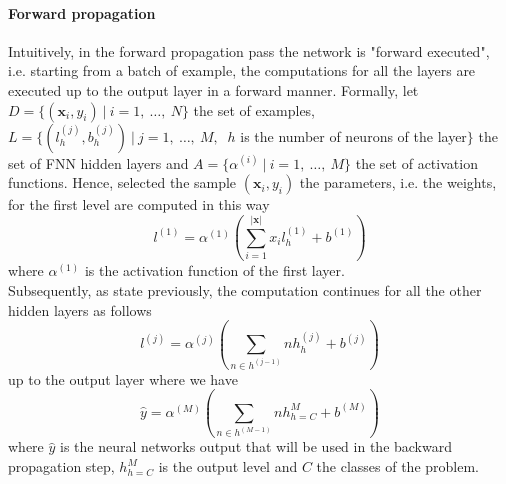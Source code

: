 \paragraph{Forward propagation}
Intuitively, in the forward propagation pass the network is "forward executed", i.e. starting from a batch of example, the computations for all the layers are executed up to the output layer in a forward manner. Formally, let $D = \{(\textbf{x}_{i}, y_{i})\ |\ i=1,\ \dots ,\ N \}$ the set of examples, $L = \{(l^{(j)}_{h}, b^{(j)}_{h})\ |\ j = 1,\ \dots,\ M,\ $ $h$ is the number of neurons of the layer$\}$ the set of FNN hidden layers and $A = \{\alpha^{(i)}\ |\ i = 1,\ \dots,\ M\}$ the set of activation functions. Hence, selected the sample $(\textbf{x}_i, y_i)$ the parameters, i.e. the weights, for the first level are computed in this way
\begin{equation}
	l^{(1)} = \alpha^{(1)}(\sum\limits_{i=1}^{|\textbf{x}|}x_{i}l_{h}^{(1)} + b^{(1)})
\end{equation}
where $\alpha^{(1)}$ is the activation function of the first layer.\\
Subsequently, as state previously, the computation continues for all the other hidden layers as follows
\begin{equation}
	l^{(j)} = \alpha^{(j)}(\sum\limits_{n \in h^{(j - 1)}}nh^{(j)}_{h} + b^{(j)})
\end{equation}
up to the output layer where we have
\begin{equation}
	\hat{y} = \alpha^{(M)}(\sum\limits_{n \in h^{(M - 1)}}nh^{M}_{h = C} + b^{(M)})	
\end{equation}
where $\hat{y}$ is the neural networks output that will be used in the backward propagation step, $h^{M}_{h = C}$ is the output level and $C$ the classes of the problem.

